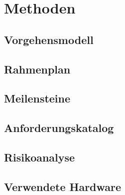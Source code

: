 \chapter{Methoden}
\label{ch:Methoden}

\section{Vorgehensmodell}

\section{Rahmenplan}

\section{Meilensteine}

\section{Anforderungskatalog}

\section{Risikoanalyse}

\section{Verwendete Hardware}